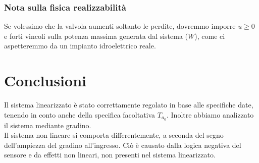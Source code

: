 \documentclass{article}
\begin{document}
\subsubsection{Nota sulla fisica realizzabilità}
Se volessimo che la valvola aumenti soltanto le perdite, dovremmo imporre $u\geq0$ e forti vincoli sulla potenza massima generata dal sistema ($W$), come ci aspetteremmo da un impianto idroelettrico reale.

\section{Conclusioni}

Il sistema linearizzato è stato correttamente regolato in base alle specifiche date, tenendo in conto anche della specifica facoltativa $T_{a_0}$. Inoltre abbiamo analizzato il sistema mediante gradino.\\

Il sistema non lineare si comporta differentemente, a seconda del segno dell'ampiezza del gradino all'ingresso. Ciò è causato dalla logica negativa del sensore e da effetti non lineari, non presenti nel sistema linearizzato.
\end{document}
